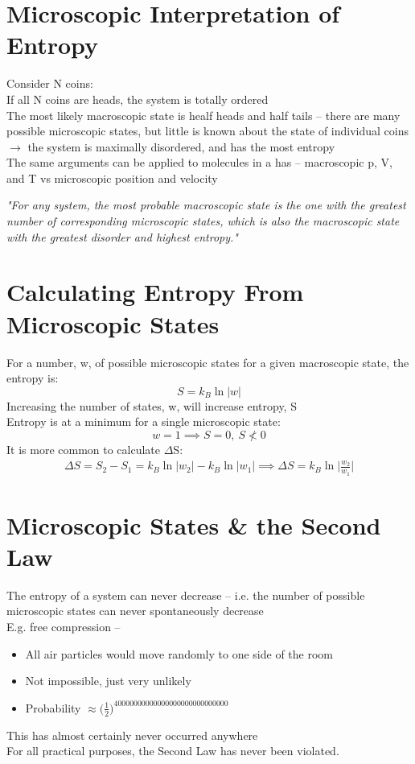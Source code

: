 \documentclass[a4paper, 11pt, normalem]{report}
\begin{document}
\section{Microscopic Interpretation of Entropy}
Consider N coins:\\
If all N coins are heads, the system is totally ordered \\
The most likely macroscopic state is healf heads and half tails -- there are many possible microscopic states, but little is known about the state of individual coins $\rightarrow$ the system is maximally disordered, and has the most entropy \\
The same arguments can be applied to molecules in a has -- macroscopic p, V, and T vs microscopic position and velocity

\emph{"For any system, the most probable macroscopic state is the one with the greatest number of corresponding microscopic states, which is also the macroscopic state with the greatest disorder and highest entropy."}

\section{Calculating Entropy From Microscopic States}
For a number, w, of possible microscopic states for a given macroscopic state, the entropy is:
\begin{equation*}
	S = k_{B}\ln{|w|}
\end{equation*}
Increasing the number of states, w, will increase entropy, S \\
Entropy is at a minimum for a single microscopic state:
\begin{equation*}
	w = 1 \implies S = 0, ~ S \nless 0
\end{equation*}
It is more common to calculate $\Delta$S:
\begin{gather*}
	{\Delta}S = S_{2} - S_{1} = k_{B}\ln{|w_{2}|} - k_{B}\ln{|w_{1}|}
	\implies {\Delta}S = k_{B}\ln{\bigg|\frac{w_{2}}{w_{1}}\bigg|}
\end{gather*}

\section{Microscopic States \& the Second Law}
The entropy of a system can never decrease -- i.e. the number of possible microscopic states can never spontaneously decrease \\
E.g. free compression --
\begin{itemize}
	\item All air particles would move randomly to one side of the room
	\item Not impossible, just very unlikely
	\item Probability $\approx \big(\frac{1}{2}\big)^{40000000000000000000000000000}$
\end{itemize}
This has almost certainly never occurred anywhere \\
For all practical purposes, the Second Law has never been violated.
\end{document}
